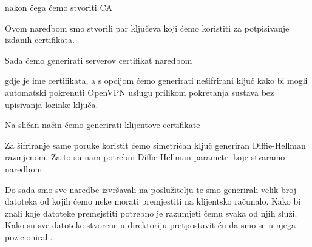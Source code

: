         
        \noindent
        nakon čega ćemo stvoriti CA 

        \noindent
        
        \noindent
        Ovom naredbom smo stvorili par ključeva koji ćemo koristiti za
        potpisivanje izdanih certifikata. 

        \noindent
        Sada ćemo generirati serverov certifikat naredbom

        \noindent

        \noindent
        gdje je  ime certifikata, a s  opcijom ćemo
        generirati nešifrirani ključ kako bi mogli automatski pokrenuti OpenVPN
        uslugu prilikom pokretanja sustava bez upisivanja lozinke ključa.

        Na sličan način ćemo generirati klijentove certifikate

        \noindent
        
        \noindent
        Za šifriranje same poruke koristit ćemo simetričan ključ generiran
        Diffie-Hellman razmjenom. Za to su nam potrebni Diffie-Hellman
        parametri koje stvaramo naredbom

        \noindent

        \noindent
        Do sada smo sve naredbe izvršavali na poslužitelju te smo generirali
        velik broj datoteka od kojih ćemo neke morati premjestiti na klijentsko
        računalo. Kako bi znali koje datoteke premejstiti potrebno je razumjeti
        čemu svaka od njih služi. Kako su sve datoteke stvorene u 
        direktoriju pretpostavit ću da smo se u njega pozicionirali.

